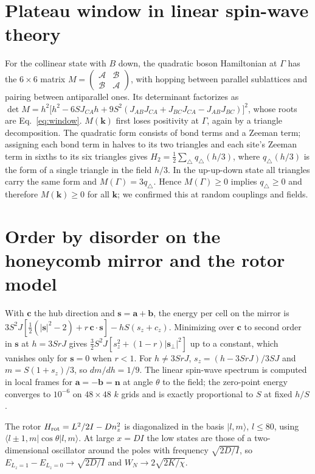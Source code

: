 \documentclass[prb,twocolumn,superscriptaddress,amsmath,amssymb,floatfix]{revtex4-2}
\begin{document}
\section{Plateau window in linear spin-wave theory}
\label{app:window}
For the collinear state with $B$ down, the quadratic boson Hamiltonian at $\Gamma$ has the $6\times6$ matrix $M=\left(\begin{smallmatrix}\mathcal A&\mathcal B\\ \mathcal B&\mathcal A\end{smallmatrix}\right)$, with hopping between parallel sublattices and pairing between antiparallel ones. Its determinant factorizes as
$\det M=h^2\big[h^2-6SJ_{CA}h+9S^2(J_{AB}J_{CA}+J_{BC}J_{CA}-J_{AB}J_{BC})\big]^2$,
whose roots are Eq.~\eqref{eq:window}. $M(\mathbf k)$ first loses positivity at $\Gamma$, again by a triangle decomposition. The quadratic form consists of bond terms and a Zeeman term; assigning each bond term in halves to its two triangles and each site's Zeeman term in sixths to its six triangles gives $H_2=\tfrac12\sum_\triangle q_\triangle(h/3)$, where $q_\triangle(h/3)$ is the form of a single triangle in the field $h/3$. In the up-up-down state all triangles carry the same form and $M(\Gamma)=3q_\triangle$. Hence $M(\Gamma)\ge0$ implies $q_\triangle\ge0$ and therefore $M(\mathbf k)\ge0$ for all $\mathbf k$; we confirmed this at random couplings and fields.

\section{Order by disorder on the honeycomb mirror and the rotor model}
\label{app:rotor}
With $\mathbf c$ the hub direction and $\mathbf s=\mathbf a+\mathbf b$, the energy per cell on the mirror is $3S^2J[\tfrac12(|\mathbf s|^2-2)+r\,\mathbf c\cdot\mathbf s]-hS(s_z+c_z)$. Minimizing over $\mathbf c$ to second order in $\mathbf s$ at $h=3SrJ$ gives $\tfrac32S^2J[s_z^2+(1-r)|\mathbf s_\perp|^2]$ up to a constant, which vanishes only for $\mathbf s=0$ when $r<1$. For $h\ne3SrJ$, $s_z=(h-3SrJ)/3SJ$ and $m=S(1+s_z)/3$, so $dm/dh=1/9$. The linear spin-wave spectrum is computed in local frames for $\mathbf a=-\mathbf b=\mathbf n$ at angle $\theta$ to the field; the zero-point energy converges to $10^{-6}$ on $48\times48$ $k$ grids and is exactly proportional to $S$ at fixed $h/S$.

The rotor $H_{\rm rot}=L^2/2I-Dn_z^2$ is diagonalized in the basis $|l,m\rangle$, $l\le80$, using $\langle l\pm1,m|\cos\theta|l,m\rangle$. At large $x=DI$ the low states are those of a two-dimensional oscillator around the poles with frequency $\sqrt{2D/I}$, so $E_{L_z=1}-E_{L_z=0}\to\sqrt{2D/I}$ and $W_N\to2\sqrt{2K/\chi}$.
\end{document}
